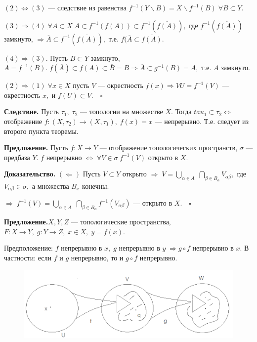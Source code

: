 \documentclass[12pt,a4paper]{article}
\begin{document}
$(2) \Leftrightarrow (3)$ --- следствие из равенства $f^{-1}(Y \backslash B) = X \backslash f^{-1}(B) \; \forall B \subset Y.$ 
 
$(3) \Rightarrow (4) \; \forall A \subset X \; A \subset f^{-1}(f(A)) \subset f^{-1}(\overline{f(A)}),$ где $f^{-1}(\overline{f(A)})$ замкнуто, $\Rightarrow \overline{A} \subset f^{-1}(\overline{f(A)}),$ т.е. $f(\overline{A} \subset \overline{f(A)}.$ 

$(4) \Rightarrow (3).$ Пусть $B \subset Y$ замкнуто, $A = f^{-1}(B). \; f(\overline{A}) \subset \overline{f(A)} \subset \overline{B} = B \Rightarrow \overline{A} \subset g^{-1}(B) = A,$ т.е. $A$ замкнуто. 

$(2) \Rightarrow (1) \; \forall x \in X$ пусть $V$ --- окрестность $f(x) \Rightarrow VU = f^{-1}(V)$ --- окрестность $x,$ и $f(U) \subset V. \quad \square$ 

\textbf{Следствие.} Пусть $\tau_{1}, \; \tau_{2}$ --- топологии на множестве $X.$ Тогда $tau_{1} \subset \tau_{2} \Leftrightarrow$ отображение $f: (X, \tau_{2}) \to (X, \tau_{1}), \; f(x) = x$ --- непрерывно. Т.е. следует из второго пункта теоремы. 

\textbf{Предложение.} Пусть $f: X \to Y$ --- отображение топологических пространств, $\sigma$ --- предбаза $Y.$ $f$ непрерывно $\Leftrightarrow \; \forall V \in \sigma \; f^{-1}(V)$ открыто в $X.$ 

\textbf{Доказательство.} $(\Leftarrow)$ Пусть $V \subset Y$ открыто $\Rightarrow \; V = \underset{\alpha \in A}{\bigcup} \; \underset{\beta \in B_{\alpha}}{\bigcap} V_{\alpha \beta},$ где $V_{\alpha\beta} \in \sigma,$ а множества $B_{x}$ конечны. 
	
$\Rightarrow \; f^{-1}(V) = \underset{\alpha \in A}{\bigcup} \; \underset{\beta \in B_{\alpha}}{\bigcap} f^{-1}(V_{\alpha \beta})$ --- открыто в $X. \quad \square$ 

\textbf{Предложение.}$X, Y, Z$ --- топологические пространства, $F: X \to Y, \; g: Y \to Z, \; x \in X, \; y = f(x).$ 

Предположение: $f$ непрерывно в $x, \; g$ непрерывно в $y \; \Rightarrow g \circ f$ непрерывно в $x.$ В частности: если $f$ и $g$ непрерывно, то и $g \circ f$ непрерывно. 

\begin{figure}[htpb]
	\centering
	\includegraphics[width=0.8\linewidth]{lect5_1.png}
\end{figure}
\end{document}
